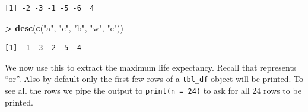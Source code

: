 \documentclass[]{krantz}
\makeatletter
\newenvironment{Shaded}{\begin{snugshade}}{\end{snugshade}}
\newcommand{\DataTypeTok}[1]{\textcolor[rgb]{0.27,0.27,0.27}{#1}}
\newcommand{\DecValTok}[1]{\textcolor[rgb]{0.06,0.06,0.06}{#1}}
\newcommand{\KeywordTok}[1]{\textcolor[rgb]{0.27,0.27,0.27}{\textbf{#1}}}
\newcommand{\NormalTok}[1]{#1}
\newcommand{\OperatorTok}[1]{\textcolor[rgb]{0.43,0.43,0.43}{\textbf{#1}}}
\newcommand{\StringTok}[1]{\textcolor[rgb]{0.5,0.5,0.5}{#1}}
\newenvironment{kframe}{%
\medskip{}
\setlength{\fboxsep}{.8em}
 \def\at@end@of@kframe{}%
 \ifinner\ifhmode%
  \def\at@end@of@kframe{\end{minipage}}%
  \begin{minipage}{\columnwidth}%
 \fi\fi%
 \def\FrameCommand##1{\hskip\@totalleftmargin \hskip-\fboxsep
 \colorbox{shadecolor}{##1}\hskip-\fboxsep
     \hskip-\linewidth \hskip-\@totalleftmargin \hskip\columnwidth}%
 \MakeFramed {\advance\hsize-\width
   \@totalleftmargin\z@ \linewidth\hsize
   \@setminipage}}%
 {\par\unskip\endMakeFramed%
 \at@end@of@kframe}
\renewenvironment{Shaded}{\begin{kframe}}{\end{kframe}}
\makeatother
\begin{document}
\begin{verbatim}
[1] -2 -3 -1 -5 -6  4
\end{verbatim}

\begin{Shaded}
\begin{Highlighting}[]
\OperatorTok{>}\StringTok{ }\KeywordTok{desc}\NormalTok{(}\KeywordTok{c}\NormalTok{(}\StringTok{"a"}\NormalTok{, }\StringTok{"c"}\NormalTok{, }\StringTok{"b"}\NormalTok{, }\StringTok{"w"}\NormalTok{, }\StringTok{"e"}\NormalTok{))}
\end{Highlighting}
\end{Shaded}

\begin{verbatim}
[1] -1 -3 -2 -5 -4
\end{verbatim}

We now use this to extract the maximum life expectancy. Recall that \texttt{\textbar{}} represents ``or''. Also by default only the first few rows of a \texttt{tbl\_df} object will be printed. To see all the rows we pipe the output to \texttt{print(n\ =\ 24)} to ask for all 24 rows to be printed.

\begin{Shaded}
\end{Shaded}
\end{document}
